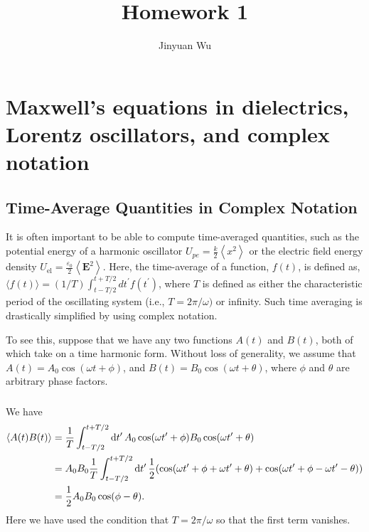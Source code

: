 \documentclass[hyperref, a4paper]{article}
\title{Homework 1}
\author{Jinyuan Wu}
\begin{document}
\maketitle

\section{Maxwell's equations in dielectrics, Lorentz oscillators, and complex notation}

\subsection{Time-Average Quantities in Complex Notation}

It is often important to be able to compute time-averaged quantities, such as the potential energy of a harmonic oscillator $U_{p e}=\frac{k}{2}\left\langle x^2\right\rangle$ or the electric field energy density $U_{\mathrm{el}}=\frac{\varepsilon_0}{2}\left\langle\mathbf{E}^2\right\rangle$. Here, the time-average of a function, $f(t)$, is defined as, $\langle f(t)\rangle=(1 / T) \int_{t-T / 2}^{t+T / 2} d t^{\prime} f\left(t^{\prime}\right)$, where $T$ is defined as either the characteristic period of the oscillating system (i.e., $T=2 \pi / \omega)$ or infinity. Such time averaging is drastically simplified by using complex notation.

To see this, suppose that we have any two functions $A(t)$ and $B(t)$, both of which take on a time harmonic form. Without loss of generality, we assume that $A(t)=A_0 \cos (\omega t+\phi)$, and $B(t)=B_0 \cos (\omega t+\theta)$, where $\phi$ and $\theta$ are arbitrary phase factors.

\subsubsection{}

We have 
\begin{equation}
    \begin{aligned}
        \expval{A(t) B(t)} &= 
        \frac{1}{T} \int_{t - T/2}^{t + T/2} \dd{t'} 
            A_0 \cos(\omega t' + \phi) 
            B_0 \cos (\omega t' + \theta) \\
        &= A_0 B_0 \frac{1}{T} \int_{t - T/2}^{t + T/2} \dd{t'} 
            \frac{1}{2} (
                \cos(\omega t' + \phi + \omega t' + \theta) 
                + \cos (\omega t' + \phi - \omega t' - \theta)
            ) \\
        &= \frac{1}{2} A_0 B_0 \cos (\phi - \theta).
    \end{aligned}
\end{equation}
Here we have used the condition that $T = 2 \pi / \omega$ 
so that the first term vanishes.
\end{document}
